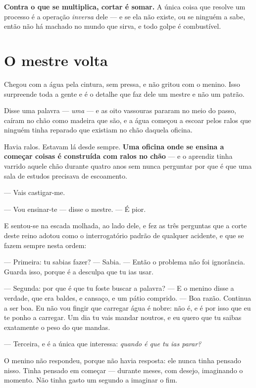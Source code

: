 \documentclass[livro.tex]{subfiles}
\begin{document}
\textbf{Contra o que se multiplica, cortar é somar.} A única coisa que resolve um processo
é a operação \emph{inversa} dele --- e se ela não existe, ou se ninguém a sabe, então não
há machado no mundo que sirva, e todo golpe é combustível.

\chapter{O mestre volta}

Chegou com a água pela cintura, sem pressa, e não gritou com o menino. Isso surpreende
toda a gente e é o detalhe que faz dele um mestre e não um patrão.

Disse uma palavra --- \emph{uma} --- e as oito vassouras pararam no meio do passo, caíram
no chão como madeira que são, e a água começou a escoar pelos ralos que ninguém tinha
reparado que existiam no chão daquela oficina.

Havia ralos. Estavam lá desde sempre. \textbf{Uma oficina onde se ensina a começar coisas
é construída com ralos no chão} --- e o aprendiz tinha varrido aquele chão durante quatro
anos sem nunca perguntar por que é que uma sala de estudos precisava de escoamento.

\medskip

--- Vais castigar-me.

--- Vou ensinar-te --- disse o mestre. --- É pior.

E sentou-se na escada molhada, ao lado dele, e fez as três perguntas que a corte deste
reino adotou como o interrogatório padrão de qualquer acidente, e que se fazem sempre
nesta ordem:

\medskip

--- Primeira: tu sabias fazer? --- Sabia. --- Então o problema não foi ignorância. Guarda
isso, porque é a desculpa que tu ias usar.

--- Segunda: por que é que tu foste buscar a palavra? --- E o menino disse a verdade, que
era baldes, e cansaço, e um pátio comprido. --- Boa razão. Continua a ser boa. Eu não vou
fingir que carregar água é nobre: não é, e é por isso que eu te ponho a carregar. Um dia
tu vais mandar noutros, e eu quero que tu saibas exatamente o peso do que mandas.

--- Terceira, e é a única que interessa: \emph{quando é que tu ias parar?}

\medskip

O menino não respondeu, porque não havia resposta: ele nunca tinha pensado nisso. Tinha
pensado em começar --- durante meses, com desejo, imaginando o momento. Não tinha gasto um
segundo a imaginar o fim.
\end{document}
